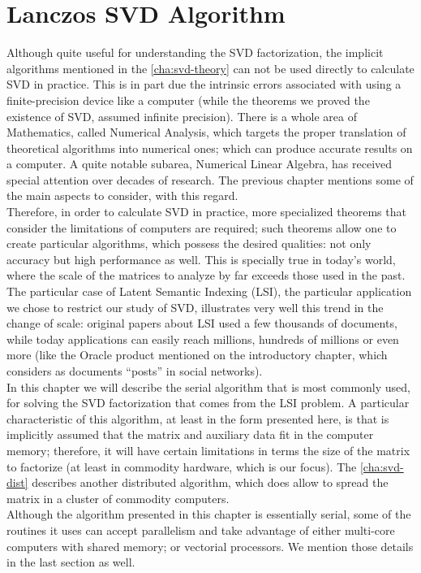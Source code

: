\chapter{Lanczos SVD Algorithm}

Although quite useful for understanding the SVD factorization, the
implicit algorithms mentioned in the \cref{cha:svd-theory} can not be
used directly to calculate SVD in practice. This is in part due the
intrinsic errors associated with using a finite-precision device like
a computer (while the theorems we proved the existence of SVD, assumed
infinite precision). There is a whole area of Mathematics, called
Numerical Analysis, which targets the proper translation of
theoretical algorithms into numerical ones; which can produce accurate
results on a computer. A quite notable subarea, Numerical Linear
Algebra, has received special attention over decades of research. The
previous chapter mentions some of the main aspects to consider, with
this regard. \\

Therefore, in order to calculate SVD in practice, more specialized
theorems that consider the limitations of computers are required; such
theorems allow one to create particular algorithms, which possess the
desired qualities: not only accuracy but high performance as well.
This is specially true in today's world, where the scale of the
matrices to analyze by far exceeds those used in the past. The
particular case of Latent Semantic Indexing (LSI), the particular
application we chose to restrict our study of SVD, illustrates very
well this trend in the change of scale: original papers about LSI used
a few thousands of documents, while today applications can easily
reach millions, hundreds of millions or even more (like the Oracle
product mentioned on the introductory chapter, which considers as
documents ``posts'' in social networks). \\

In this chapter we will describe the serial algorithm that is most
commonly used, for solving the SVD factorization that comes from the
LSI problem. A particular characteristic of this algorithm, at least
in the form presented here, is that is implicitly assumed that the
matrix and auxiliary data fit in the computer memory; therefore, it
will have certain limitations in terms the size of the matrix to
factorize (at least in commodity hardware, which is our focus).  The
\cref{cha:svd-dist} describes another distributed algorithm, which does allow
to spread the matrix in a cluster of commodity computers. \\

Although the algorithm presented in this chapter is essentially
serial, some of the routines it uses can accept parallelism and take
advantage of either multi-core computers with shared memory; or
vectorial processors. We mention those details in the last section as
well. 




